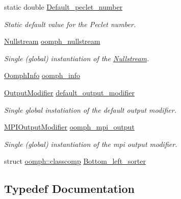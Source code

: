\begin{DoxyCompactItemize}
static double \hyperlink{namespaceoomph_a76008dfc377a12c79c93b9c506577c63}{Default\+\_\+peclet\+\_\+number}
\begin{DoxyCompactList}\small\item\em Static default value for the Peclet number. \end{DoxyCompactList}\item 
\hyperlink{classoomph_1_1Nullstream}{Nullstream} \hyperlink{namespaceoomph_a71421688cd14bcbb18a23c64b7245941}{oomph\+\_\+nullstream}
\begin{DoxyCompactList}\small\item\em Single (global) instantiation of the \hyperlink{classoomph_1_1Nullstream}{Nullstream}. \end{DoxyCompactList}\item 
\hyperlink{classoomph_1_1OomphInfo}{Oomph\+Info} \hyperlink{namespaceoomph_aec474227917784dc0a255faf289cfc16}{oomph\+\_\+info}
\item 
\hyperlink{classoomph_1_1OutputModifier}{Output\+Modifier} \hyperlink{namespaceoomph_acf24e85e104eb2295a9c8c6f77ada393}{default\+\_\+output\+\_\+modifier}
\begin{DoxyCompactList}\small\item\em Single global instatiation of the default output modifier. \end{DoxyCompactList}\item 
\hyperlink{classoomph_1_1MPIOutputModifier}{M\+P\+I\+Output\+Modifier} \hyperlink{namespaceoomph_ad23588cc980c3f75478368f9c4172b9a}{oomph\+\_\+mpi\+\_\+output}
\begin{DoxyCompactList}\small\item\em Single (global) instantiation of the mpi output modifier. \end{DoxyCompactList}\item 
struct \hyperlink{structoomph_1_1classcomp}{oomph\+::classcomp} \hyperlink{namespaceoomph_a14c756ede5a394b4c6cbf49448813b7e}{Bottom\+\_\+left\+\_\+sorter}
\end{DoxyCompactItemize}


\subsection{Typedef Documentation}
\mbox{\label{namespaceoomph_a0a75fbfa1139f00cf88adeee835c8fe5}} 
